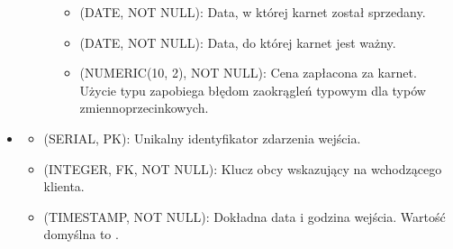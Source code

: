 \documentclass[letterpaper,10pt,polish]{sphinxmanual}
\begin{document}
\begin{itemize}
\begin{description}
\begin{itemize}
\item {} 
\sphinxAtStartPar
{} (DATE, NOT NULL): Data, w której karnet został sprzedany.

\item {} 
\sphinxAtStartPar
{} (DATE, NOT NULL): Data, do której karnet jest ważny.

\item {} 
\sphinxAtStartPar
{} (NUMERIC(10, 2), NOT NULL): Cena zapłacona za karnet. Użycie typu  zapobiega błędom zaokrągleń typowym dla typów zmiennoprzecinkowych.

\end{itemize}

\end{description}

\item {} \begin{description}
\begin{itemize}
\item {} 
\sphinxAtStartPar
{} (SERIAL, PK): Unikalny identyfikator zdarzenia wejścia.

\item {} 
\sphinxAtStartPar
{} (INTEGER, FK, NOT NULL): Klucz obcy wskazujący na wchodzącego klienta.

\item {} 
\sphinxAtStartPar
{} (TIMESTAMP, NOT NULL): Dokładna data i godzina wejścia. Wartość domyślna to .

\end{itemize}

\end{description}

\end{itemize}
\end{document}
